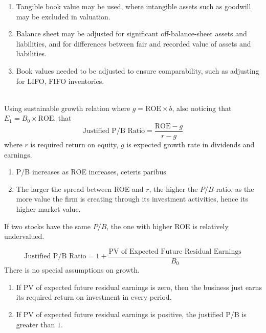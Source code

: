 \begin{remark} 
\begin{enumerate}[label=\roman*.]
\setlength{\itemsep}{0pt}
\item Tangible book value may be used, where intangible assets such as goodwill may be excluded in valuation.
\item Balance sheet may be adjusted for significant off-balance-sheet assets and liabilities, and for differences between fair and recorded value of assets and liabilities.
\item Book values needed to be adjusted to ensure comparability, such as adjusting for LIFO, FIFO inventories.
\end{enumerate}
\end{remark}

\begin{definition} \\
Using sustainable growth relation where $g = \text{ROE} \times b$, also noticing that $E_1 = B_0 \times \text{ROE}$, that
\begin{equation}
\text{Justified P/B Ratio} = \frac{\text{ROE} - g}{r - g} \nonumber
\end{equation}
where $r$ is required return on equity, $g$ is expected growth rate in dividends and earnings.
\begin{enumerate}[label=\roman*.]
\setlength{\itemsep}{0pt}
\item P/B increases as ROE increases, ceteris paribus
\item The larger the spread between ROE and $r$, the higher the $P/B$ ratio, as the more value the firm is creating through its investment activities, hence its higher market value.
\end{enumerate}
If two stocks have the same $P/B$, the one with higher ROE is relatively undervalued.
\end{definition}

\begin{remark} 
\begin{equation}
\text{Justified P/B Ratio} = 1 + \frac{\text{PV of Expected Future Residual Earnings}}{B_0} \nonumber
\end{equation}
There is no special assumptions on growth.
\begin{enumerate}[label=\roman*.]
\setlength{\itemsep}{0pt}
\item If PV of expected future residual earnings is zero, then the business just earns its required return on investment in every period.
\item If PV of expected future residual earnings is positive, the justified P/B is greater than $1$.
\end{enumerate}
\end{remark}

